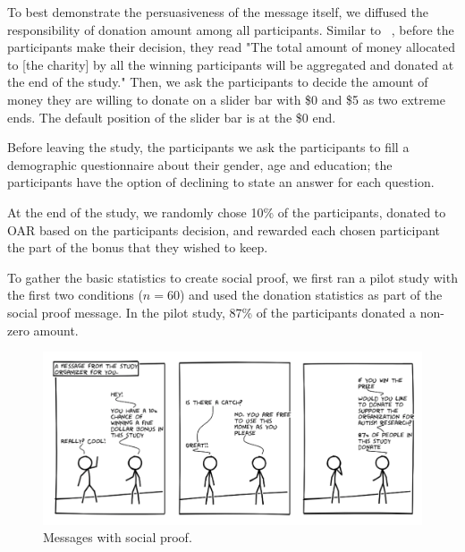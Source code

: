 To best demonstrate the persuasiveness of the message itself, we diffused the responsibility of donation amount among all participants. Similar to ~\textcite{lee2013does}, before the participants make their decision, they read "The total amount of money allocated to [the charity] by all the winning participants will be aggregated and donated at the end of the study." Then, we ask the participants to decide the amount of money they are willing to donate on a slider bar with \$0 and \$5 as two extreme ends. The default position of the slider bar is at the \$0 end.

Before leaving the study, the participants we ask the participants to fill a demographic questionnaire about their gender, age and education; the participants have the option of declining to state an answer for each question.

At the end of the study, we randomly chose 10\% of the participants, donated to OAR based on the participants decision, and rewarded each chosen participant the part of the bonus that they wished to keep.

To gather the basic statistics to create social proof, we first ran a pilot study with the first two conditions ($n=60$) and used the donation statistics as part of the social proof message. In the pilot study, 87\% of the participants donated a non-zero amount. 



\begin{figure}[bt]
	\centering
	\includegraphics[width=\columnwidth]{./figures/social_proof.png}
	\caption{Messages with social proof.}
	\label{fig:basic three comic social proof}
\end{figure}


